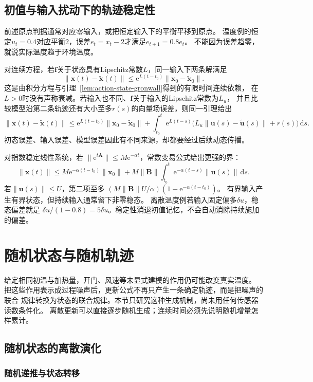 \subsection{初值与输入扰动下的轨迹稳定性}

前述原点判据通常对应零输入，或把恒定输入下的平衡平移到原点。
温度例的恒定$u_t=0.4$对应平衡$2$，误差$e_t=x_t-2$才满足$e_{t+1}=0.8e_t$。
不能因为误差趋零，就说实际温度趋于环境温度。

对连续方程，若$\bm f$关于状态具有Lipschitz常数$L$，同一输入下两条解满足
\[
  \|\bm x(t)-\widetilde{\bm x}(t)\|
  \leq \mathrm e^{L(t-t_0)}\|\bm x_0-\widetilde{\bm x}_0\|.
\]
这是由积分方程与引理~\ref{lem:action-state-gronwall}得到的有限时间连续依赖，
在$L>0$时没有声称衰减。若输入也不同、$\bm f$关于输入的Lipschitz常数为$L_u$，
并且比较模型沿第二条轨迹还有大小至多$r(s)$的向量场误差，则同一引理给出
\[
  \|\bm x(t)-\widetilde{\bm x}(t)\|
  \leq \mathrm e^{L(t-t_0)}\|\bm x_0-\widetilde{\bm x}_0\|
  +\int_{t_0}^t\mathrm e^{L(t-s)}
     \bigl(L_u\|\bm u(s)-\widetilde{\bm u}(s)\|+r(s)\bigr)\,\mathrm ds.
\]
初态误差、输入误差、模型误差因此有不同来源，却都要经过后续动态传播。

对指数稳定线性系统，若
$\|\mathrm e^{t\bm A}\|\leq M\mathrm e^{-\alpha t}$，常数变易公式给出更强的界：
\[
  \|\bm x(t)\|
  \leq M\mathrm e^{-\alpha(t-t_0)}\|\bm x_0\|
  +M\|\bm B\|\int_{t_0}^t\mathrm e^{-\alpha(t-s)}\|\bm u(s)\|\,\mathrm ds.
\]
若$\|\bm u(s)\|\leq U$，第二项至多
$(M\|\bm B\|U/\alpha)(1-\mathrm e^{-\alpha(t-t_0)})$。
有界输入产生有界状态，但持续输入通常留下非零稳态。
离散温度例若输入固定偏多$\delta u$，稳态偏差就是
$\delta u/(1-0.8)=5\delta u$。稳定性消退初值记忆，不会自动消除持续施加的偏差。

\section{随机状态与随机轨迹}
\label{sec:dynamical-ito-fokker-planck}

给定相同初温与加热量，开门、风速等未显式建模的作用仍可能改变真实温度。
把这些作用表示成过程噪声后，更新公式不再只产生一条确定轨迹，而是把噪声的联合
规律转换为状态的联合规律。本节只研究这种生成机制，尚未用任何传感器读数条件化。
离散更新可以直接逐步随机生成；连续时间必须先说明随机增量怎样累计。

\subsection{随机状态的离散演化}

\subsubsection{随机递推与状态转移}

